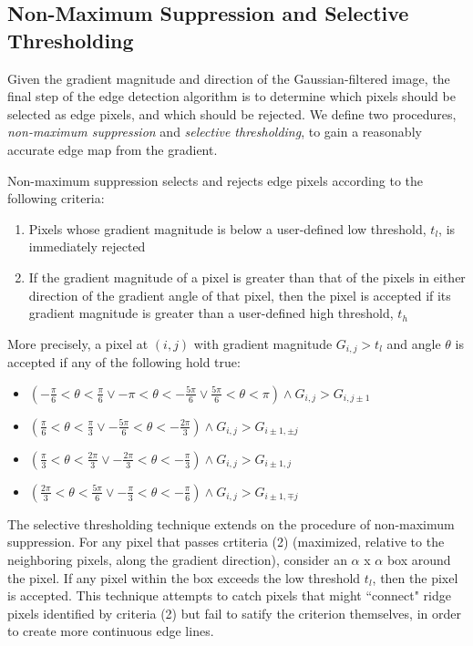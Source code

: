 \documentclass[journal]{IEEEtran}
\begin{document}
\subsection{Non-Maximum Suppression and Selective Thresholding}
Given the gradient magnitude and direction of the Gaussian-filtered image, the final step of the edge detection algorithm is to determine which pixels should be selected as edge pixels, and which should be rejected. We define two procedures, \textit{non-maximum suppression} and \textit{selective thresholding}, to gain a reasonably accurate edge map from the gradient.
\par Non-maximum suppression selects and rejects edge pixels according to the following criteria:
\begin{enumerate}
	\item Pixels whose gradient magnitude is below a user-defined low threshold, $t_l$, is immediately rejected
	\item If the gradient magnitude of a pixel is greater than that of the pixels in either direction of the gradient angle of that pixel, then the pixel is accepted if its gradient magnitude is greater than a user-defined high threshold, $t_h$
\end{enumerate}
More precisely, a pixel at $(i, j)$ with gradient magnitude $G_{i, j} > t_l$ and angle $\theta$ is accepted if any of the following hold true:
\begin{itemize}
	\item $(-\frac{\pi}{6} < \theta < \frac{\pi}{6} \vee -\pi < \theta < -\frac{5 \pi}{6} \vee \frac{5\pi}{6} < \theta < \pi) \wedge G_{i, j} > G_{i, j \pm 1}$
	\item $(\frac{\pi}{6} < \theta < \frac{\pi}{3} \vee -\frac{5 \pi}{6} < \theta < -\frac{2 \pi}{3}) \wedge G_{i, j} > G_{i \pm 1, \pm j}$
	\item $(\frac{\pi}{3} < \theta < \frac{2 \pi}{3} \vee -\frac{2 \pi}{3} < \theta < -\frac{\pi}{3}) \wedge G_{i, j} > G_{i \pm 1, j}$
	\item $(\frac{2 \pi}{3} < \theta < \frac{5 \pi}{6} \vee -\frac{\pi}{3} < \theta < -\frac{\pi}{6}) \wedge G_{i, j} > G_{i \pm 1, \mp j}$
\end{itemize}
The selective thresholding technique extends on the procedure of non-maximum suppression. For any pixel that passes crtiteria (2) (maximized, relative to the neighboring pixels, along the gradient direction), consider an $\alpha$ x $\alpha$ box around the pixel. If any pixel within the box exceeds the low threshold $t_l$, then the pixel is accepted. This technique attempts to catch pixels that might ``connect" ridge pixels identified by criteria (2) but fail to satify the criterion themselves, in order to create more continuous edge lines.
\end{document}
